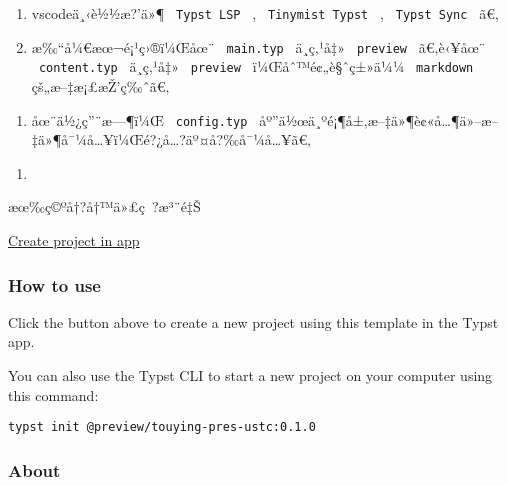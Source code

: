\begin{enumerate}
\tightlist
\item
  vscodeä¸‹è½½æ?'ä»¶ \texttt{\ Typst\ LSP\ } ,
  \texttt{\ Tinymist\ Typst\ } , \texttt{\ Typst\ Sync\ } ã€‚
\item
  æ‰``å¼€æœ¬é¡¹ç›®ï¼Œåœ¨ \texttt{\ main.typ\ } ä¸­ç‚¹å‡»
  \texttt{\ preview\ } ã€‚è‹¥åœ¨ \texttt{\ content.typ\ } ä¸­ç‚¹å‡»
  \texttt{\ preview\ } ï¼Œåˆ™é¢„è§ˆç±»ä¼¼ \texttt{\ markdown\ }
  çš„æ--‡æ¡£æŽ'ç‰ˆã€‚
\end{enumerate}

\begin{enumerate}
\tightlist
\item
  åœ¨ä½¿ç''¨æ---¶ï¼Œ \texttt{\ config.typ\ }
  åº''ä½œä¸ºé¡¶å±‚æ--‡ä»¶è¢«å\ldots¶ä»--æ--‡ä»¶å¯¼å\ldots¥ï¼Œé?¿å\ldots?äº¤å?‰å¯¼å\ldots¥ã€‚
\end{enumerate}

\begin{enumerate}
\tightlist
\item
\end{enumerate}

æœ‰ç©ºå†?å†™ä»£ç~?æ³¨é‡Š

\href{/app?template=touying-pres-ustc&version=0.1.0}{Create project in
app}

\subsubsection{How to use}\label{how-to-use}

Click the button above to create a new project using this template in
the Typst app.

You can also use the Typst CLI to start a new project on your computer
using this command:

\begin{verbatim}
typst init @preview/touying-pres-ustc:0.1.0
\end{verbatim}



\subsubsection{About}\label{about}

